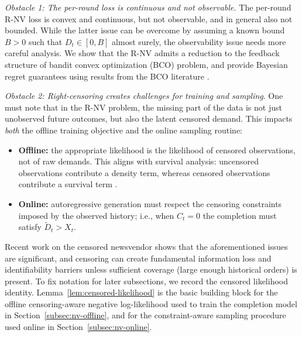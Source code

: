 \documentclass[11pt]{article}
\begin{document}
\emph{Obstacle 1: The per-round loss is continuous and not observable.} The per-round R-NV loss is convex and continuous, but not observable, and in general also not bounded. While the latter issue can be overcome by assuming a known bound $B>0$ such that $D_t\in[0,B]$ almost surely, the observability issue needs more careful analysis. We show that the R-NV admits a reduction to the feedback structure of bandit convex optimization (BCO) problem, and provide Bayesian regret guarantees using results from the BCO literature \cite{bakhtiari2025bco}. 



\emph{Obstacle 2: Right-censoring creates challenges for training and sampling}. One must note that in the R-NV problem, the missing part of the data is not just unobserved future outcomes, but also the latent censored demand. This impacts \emph{both} the offline training objective and the online sampling routine:
\begin{itemize}
\item \textbf{Offline:} the appropriate likelihood is the likelihood of censored observations, not of raw demands.
This aligns with survival analysis: uncensored observations contribute a density term, whereas censored
observations contribute a survival term \citep{kaplan1958nonparametric}.
\item \textbf{Online:} autoregressive generation must respect the censoring constraints imposed by the observed
history; i.e., when $C_t=0$ the completion must satisfy $\widetilde D_t>X_t$.
\end{itemize}












Recent work on the censored newsvendor \citep{hssaine2024censored} shows that the aforementioned issues are significant, and censoring can create fundamental information loss and identifiability barriers unless sufficient coverage (large enough historical
orders) is present. To fix notation for later subsections, we record the censored likelihood identity. Lemma~\ref{lem:censored-likelihood} is the basic building block for the offline censoring-aware
negative log-likelihood used to train the completion model in Section~\ref{subsec:nv-offline},
and for the constraint-aware sampling procedure used online in Section~\ref{subsec:nv-online}.
\end{document}
